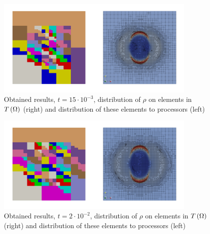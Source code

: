 \begin{figure}[H]
	\begin{center}
		\includegraphics[width=0.87\textwidth]{img/mhd-blast/old/mya4.jpg}
	\caption{Obtained results, $t = 15\cdot 10^{-3}$, distribution of $\rho$ on elements in $T\left(\Omega\right)$ (right) and distribution of these elements to processors (left)}
	\label{figure:blastOldMyAdapt4}
	\end{center}
\end{figure}
\vspace{-8mm}

\begin{figure}[H]
	\begin{center}
		\includegraphics[width=0.87\textwidth]{img/mhd-blast/old/mya5.jpg}
	\caption{Obtained results, $t = 2\cdot 10^{-2}$, distribution of $\rho$ on elements in $T\left(\Omega\right)$ (right) and distribution of these elements to processors (left)}
	\label{figure:blastOldMyAdapt5}
	\end{center}
\end{figure}
\vspace{-8mm}


